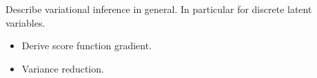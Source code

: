 Describe variational inference in general. In particular for discrete latent variables.

\begin{itemize}
  \item Derive score function gradient.
  \item Variance reduction.
\end{itemize}
